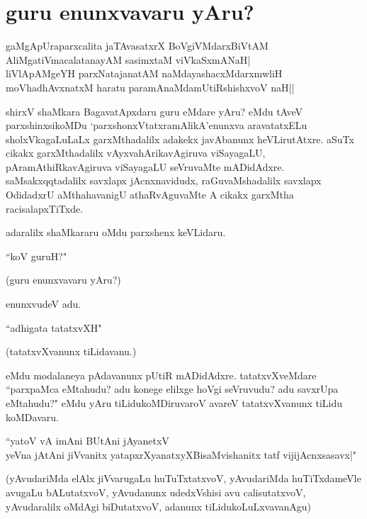 \chapter{guru enunxvavaru yAru?}\label{chap12}

\begin{shloka}
gaMgApUraparxcalita jaTAvasatxrX BoVgiVMdarxBiVtAM\\
AliMgatiVmacalatanayAM sasimxtaM viVkaSxmANaH|\\
liVlApAMgeYH parxNatajanatAM naMdayashacxMdarxmwliH\\
moVhadhAvxnatxM haratu paramAnaMdamUtiRshishxvoV naH||
\end{shloka}

shirxV shaMkara BagavatApxdaru guru eMdare yAru? eMdu tAveV parxshinxsikoMDu `parxshonxVtatxramAlikA'enunxva aravatatxELu sholxVkagaLuLaLx garxMthadalilx adakekx javAbanunx heVLirutAtxre. aSuTx cikakx garxMthadalilx vAyxvahArikavAgiruva viSayagaLU, pAramAthiRkavAgiruva viSayagaLU seVruvaMte mADidAdxre. saMsakxqqtadalilx savxlapx jAcnxnavidudx, raGuvaMshadalilx savxlapx OdidadxrU aMthahavanigU athaRvAguvaMte A cikakx garxMtha racisalapxTiTxde. 

adaralilx shaMkararu oMdu parxshenx keVLidaru.

\begin{shloka}
``koV guruH?"
\end{shloka}

(guru enunxvavaru yAru?)

enunxvudeV adu. 

\begin{shloka}
``adhigata tatatxvXH"
\end{shloka}

(tatatxvXvanunx tiLidavanu.)

eMdu modalaneya pAdavanunx pUtiR mADidAdxre. tatatxvXveMdare ``parxpaMca eMtahudu? adu konege elilxge hoVgi seVruvudu? adu savxrUpa eMtahudu?" eMdu yAru tiLidukoMDiruvaroV avareV tatatxvXvanunx tiLidu koMDavaru. 

\begin{shloka}
``yatoV vA imAni BUtAni jAyanetxV\\
yeVna jAtAni jiVvanitx yatapxrXyanatxyXBisaMvishanitx tatf vijijAcnxsasavx|"
\end{shloka}

(yAvudariMda elAlx jiVvarugaLu huTuTxtatxvoV, yAvudariMda huTiTxdameVle avugaLu bALutatxvoV, yAvudanunx udedxVshisi avu calisutatxvoV, yAvudaralilx oMdAgi biDutatxvoV, adanunx tiLidukoLuLxvavanAgu)

